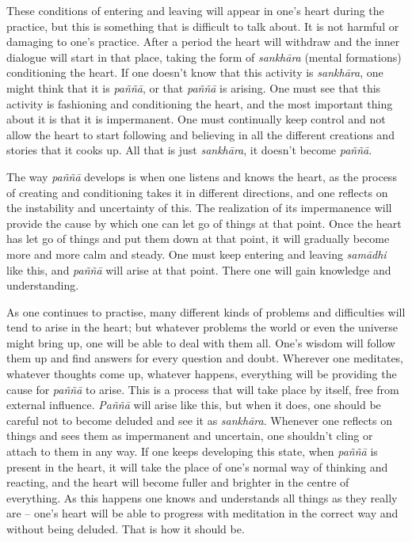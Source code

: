 These conditions of entering and leaving will appear in one's heart
during the practice, but this is something that is difficult to talk
about. It is not harmful or damaging to one's practice. After a period
the heart will withdraw and the inner dialogue will start in that place,
taking the form of \emph{sankhāra} (mental formations) conditioning the
heart. If one doesn't know that this activity is \emph{sankhāra}, one
might think that it is \emph{paññā}, or that \emph{paññā} is arising.
One must see that this activity is fashioning and conditioning the
heart, and the most important thing about it is that it is impermanent.
One must continually keep control and not allow the heart to start
following and believing in all the different creations and stories that
it cooks up. All that is just \emph{sankhāra}, it doesn't become
\emph{paññā}.

The way \emph{paññā} develops is when one listens and knows the heart,
as the process of creating and conditioning takes it in different
directions, and one reflects on the instability and uncertainty of this.
The realization of its impermanence will provide the cause by which one
can let go of things at that point. Once the heart has let go of things
and put them down at that point, it will gradually become more and more
calm and steady. One must keep entering and leaving \emph{samādhi} like
this, and \emph{paññā} will arise at that point. There one will gain
knowledge and understanding.

As one continues to practise, many different kinds of problems and
difficulties will tend to arise in the heart; but whatever problems the
world or even the universe might bring up, one will be able to deal with
them all. One's wisdom will follow them up and find answers for every
question and doubt. Wherever one meditates, whatever thoughts come up,
whatever happens, everything will be providing the cause for
\emph{paññā} to arise. This is a process that will take place by itself,
free from external influence. \emph{Paññā} will arise like this, but
when it does, one should be careful not to become deluded and see it as
\emph{sankhāra}. Whenever one reflects on things and sees them as
impermanent and uncertain, one shouldn't cling or attach to them in any
way. If one keeps developing this state, when \emph{paññā} is present in
the heart, it will take the place of one's normal way of thinking and
reacting, and the heart will become fuller and brighter in the centre of
everything. As this happens one knows and understands all things as they
really are -- one's heart will be able to progress with meditation in
the correct way and without being deluded. That is how it should be.

